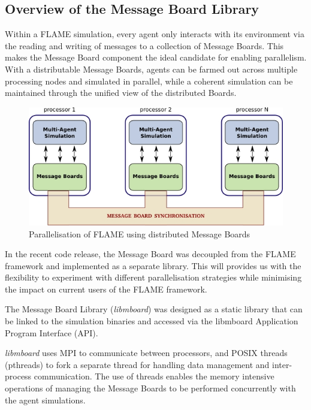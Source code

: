 \subsection{Overview of the Message Board Library}

Within a FLAME simulation, every agent only interacts with its environment via the reading and writing of messages to a collection of Message Boards. This makes the Message Board component the ideal candidate for enabling parallelism. With a distributable Message Boards, agents can be farmed out across multiple processing nodes and simulated in parallel, while a coherent simulation can be maintained through the unified view of the distributed Boards.

\begin{figure}[h]
 \centering
  \includegraphics[scale=0.50]{mboard_flame.jpg}
 \caption{Parallelisation of FLAME using distributed Message Boards}
 \label{fig:mb_flame}
\end{figure}

In the recent code release, the Message Board was decoupled from the FLAME framework and implemented as a separate library. This will provides us with the flexibility to experiment with different parallelisation strategies while minimising the impact on current users of the FLAME framework.

The Message Board Library (\textit{libmboard}) was designed as a static library that can be linked to the simulation binaries and accessed via the libmboard Application Program Interface (API). 

\textit{libmboard} uses MPI to communicate between processors, and POSIX threads (pthreads) to fork a separate thread for handling data management and inter-process communication. The use of threads enables the memory intensive operations of managing the Message Boards to be performed concurrently with the agent simulations. 

